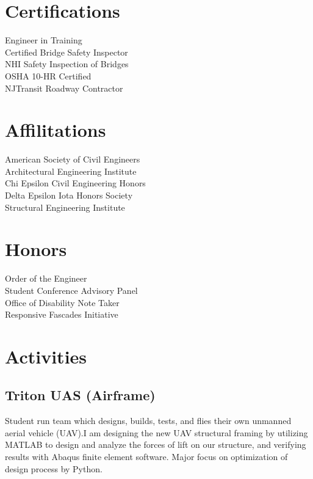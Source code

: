 \documentclass[letterpaper]{deedy-resume-openfont}
\begin{document}
\begin{minipage}[t]{0.3\textwidth}
\vspace{-0.2cm}
\sectionsep



\section{Certifications}
\vspace{-0.1cm}
Engineer in Training\\
Certified Bridge Safety Inspector\\
NHI Safety Inspection of Bridges \\
OSHA 10-HR Certified\\
NJTransit Roadway Contractor\\
\vspace{-0.2cm}
\sectionsep

\section{Affilitations}
\vspace{-0.1cm}
American Society of Civil Engineers \\
Architectural Engineering Institute \\
Chi Epsilon Civil Engineering Honors \\
Delta Epsilon Iota Honors Society \\
Structural Engineering Institute \\

\section{Honors}
\vspace{-0.1cm}
Order of the Engineer \\
Student Conference Advisory Panel \\
Office of Disability Note Taker \\
Responsive Fascades Initiative\\

\section{Activities}
\vspace{-0.1cm}
\subsection{\large Triton UAS (Airframe)}
Student run team which designs, builds, tests, and flies their own unmanned aerial vehicle (UAV).I am designing the new UAV structural framing by utilizing MATLAB to design and analyze the forces of lift on our structure, and verifying results with Abaqus finite element software. Major focus on optimization of design process by Python.\\

\sectionsep
%
%

\end{minipage} 
\end{document}
